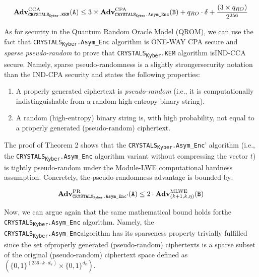 \documentclass[runningheads]{llncs}
\numberwithin{equation}{section}
\begin{document}
    \vspace{-3.4ex}
    $$ {\text{\textbf{Adv}}}_{{\text{\texttt{CRYSTALS}\textsubscript{\texttt{Kyber}}\texttt{.KEM}}}}^{\text{CCA}}\text{(\texttt{A})} \leq 3 \times {\text{\textbf{Adv}}}_{{\text{\texttt{CRYSTALS}\textsubscript{\texttt{Kyber}}\texttt{.Asym\_Enc}}}}^{\text{CPA}}\text{(\texttt{B})} + {q}_{RO} \cdot \delta + \frac{ ( 3 \times {q}_{RO} ) }{ {2}^{256} } $$

    \noindent As for security in the Quantum Random Oracle Model (QROM), we can use the fact that \texorpdfstring{\texttt{CRYSTALS}\textsubscript{\texttt{Kyber}}\texttt{.Asym\_Enc}}\/ algorithm is ONE-WAY CPA secure and \textit{sparse pseudo-random} \cite{saito-xagawa-yamakawa:tightly-secure-key-encapsulation-mechanism-quantum-random-oracle-model:2017:06-2024} to prove that \texorpdfstring{\texttt{CRYSTALS}\textsubscript{\texttt{Kyber}}\texttt{.KEM}}\/ algorithm is\break IND-CCA secure. Namely, sparse pseudo-randomness is a slightly stronger\break security notation than the IND-CPA security and states the following properties:
    \begin{enumerate}
        \item A properly generated ciphertext is \textit{pseudo-random} (i.e., it is computationally indistinguishable from a random high-entropy binary string).
        \item A random (high-entropy) binary string is, with high probability, not equal to a properly generated (pseudo-random) ciphertext.
    \end{enumerate}

    \noindent The proof of Theorem 2 shows that the \texorpdfstring{\texttt{CRYSTALS}\textsubscript{\texttt{Kyber}}\texttt{.Asym\_Enc}}\/' algorithm (i.e., the \texorpdfstring{\texttt{CRYSTALS}\textsubscript{\texttt{Kyber}}\texttt{.Asym\_Enc}}\/ algorithm variant without compressing the vector $t$) is tightly pseudo-random under the Module-LWE computational hardness assumption. Concretely, the pseudo-randomness advantage is bounded by:

    $$ {\text{\textbf{Adv}}}_{{\text{\texttt{CRYSTALS}\textsubscript{\texttt{Kyber}}\texttt{.Asym\_Enc}'}}}^{\text{PR}}\text{(\texttt{A})} \leq 2 \cdot {\text{\textbf{Adv}}}_{ ( k + 1, k, \eta ) }^{\text{MLWE}}\text{(\texttt{B})} $$

    \vspace{2ex}
    \noindent Now, we can argue again that the same mathematical bound holds for\break the \texorpdfstring{\texttt{CRYSTALS}\textsubscript{\texttt{Kyber}}\texttt{.Asym\_Enc}}\/ algorithm. Namely, the \texorpdfstring{\texttt{CRYSTALS}\textsubscript{\texttt{Kyber}}\texttt{.Asym\_Enc}}\/\break algorithm has its sparseness property trivially fulfilled since the set of\break properly generated (pseudo-random) ciphertexts is a sparse subset of the original (pseudo-random) ciphertext space defined as $\left( { \{ 0, 1 \} }^{ ( 256 \cdot k \cdot {d}_{u}) } \times { \{ 0, 1 \} }^{{d}_{v}} \right)$.\
\end{document}
